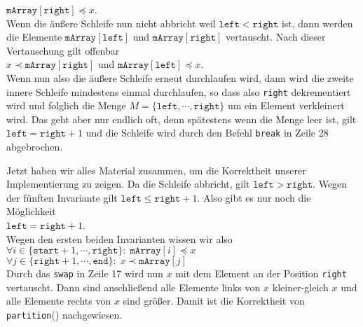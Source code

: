 \begin{enumerate}
      \hspace*{1.3cm} $\mathtt{mArray}[\mathtt{right}] \preceq x$. \\[0.1cm]
      Wenn die \"au\ss{}ere Schleife nun nicht abbricht weil $\texttt{left} < \mathtt{right}$ ist,
      dann werden die Elemente $\mathtt{mArray}[\mathtt{left}]$ und
      $\mathtt{mArray}[\mathtt{right}]$ vertauscht.  Nach dieser Vertauschung gilt 
      offenbar \\[0.1cm]
      \hspace*{1.3cm} 
      $x \prec \mathtt{mArray}[\mathtt{right}]$ \quad und \quad $\mathtt{mArray}[\mathtt{left}] \preceq x$. 
      \\[0.1cm]
      Wenn nun also die \"au\ss{}ere Schleife erneut durchlaufen wird, dann wird die zweite
      innere Schleife mindestens einmal durchlaufen, so dass also \texttt{right}
      dekrementiert wird und folglich die Menge $M = \{ \mathtt{left}, \cdots, \mathtt{right} \}$ 
      um ein Element verkleinert wird.  Das geht aber nur endlich oft, denn sp\"atestens
      wenn die Menge leer ist, gilt $\mathtt{left} = \mathtt{right} + 1$
      und die Schleife wird durch den Befehl \texttt{break} in Zeile 28 abgebrochen. 
\end{enumerate}
Jetzt haben wir alles Material zusammen, um die Korrektheit unserer Implementierung zu zeigen.
Da die Schleife abbricht, gilt $\mathtt{left} > \mathtt{right}$.  Wegen der f\"unften
Invariante gilt $\texttt{left} \leq \mathtt{right} + 1$.  Also gibt es nur noch die
M\"oglichkeit
\\[0.2cm]
\hspace*{1.3cm}
$\texttt{left} = \mathtt{right} +
1$.
\\[0.2cm]  
Wegen den ersten beiden Invarianten
wissen wir also \\[0.1cm]
\hspace*{1.3cm} 
 $\forall i \in \{ \mathtt{start}+1, \cdots, \mathtt{right} \} \colon\; \mathtt{mArray}[i] \preceq x$ \\[0.1cm]
\hspace*{1.3cm} 
 $\forall j \in \{ \mathtt{right}+1, \cdots, \mathtt{end} \} \colon\; x \prec \mathtt{mArray}[j]$
\\[0.1cm]
Durch das \texttt{swap} in Zeile 17 wird nun $x$ mit dem Element an der Position
\texttt{right} vertauscht.  Dann sind anschlie\ss{}end alle Elemente links von $x$
kleiner-gleich $x$ und alle Elemente rechts von $x$ sind gr\"o\ss{}er.
Damit ist die Korrektheit von \texttt{partition}() nachgewiesen.

